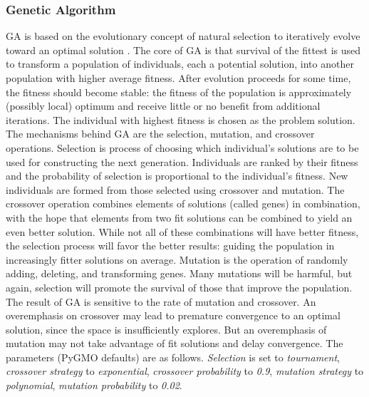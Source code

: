 \documentclass{tamuccthesis}
\begin{document}
\subsubsection{Genetic Algorithm}

GA is based on the evolutionary concept of natural selection to iteratively evolve toward an optimal solution \cite{ga:cao:2016}. The core of GA is that survival of the fittest is used to transform a population of individuals, each a potential solution, into another population with higher average fitness. After evolution proceeds for some time, the fitness should become stable: the fitness of the population is approximately (possibly local) optimum and receive little or no benefit from additional iterations. The individual with highest fitness is chosen as the problem solution. The mechanisms behind GA are the selection, mutation, and crossover operations. Selection is process of choosing which individual's solutions are to be used for constructing the next generation. Individuals are ranked by their fitness and the probability of selection is proportional to the individual's fitness. New individuals are formed from those selected using crossover and mutation. The crossover operation combines elements of solutions (called genes) in combination, with the hope that elements from two fit solutions can be combined to yield an even better solution. While not all of these combinations will have better fitness, the selection process will favor the better results: guiding the population in increasingly fitter solutions on average. Mutation is the operation of randomly adding, deleting, and transforming genes. Many mutations will be harmful, but again, selection will promote the survival of those that improve the population. The result of GA is sensitive to the rate of mutation and crossover. An overemphasis on crossover may lead to premature convergence to an optimal solution, since the space is insufficiently explores. But an overemphasis of mutation may not take advantage of fit solutions and delay convergence. The parameters (PyGMO defaults) are as follows. \textit{Selection} is set to \textit{tournament}, \textit{crossover strategy} to \textit{exponential}, \textit{crossover probability} to \textit{0.9}, \textit{mutation strategy} to \textit{polynomial}, \textit{mutation probability} to \textit{0.02}. 
\end{document}
